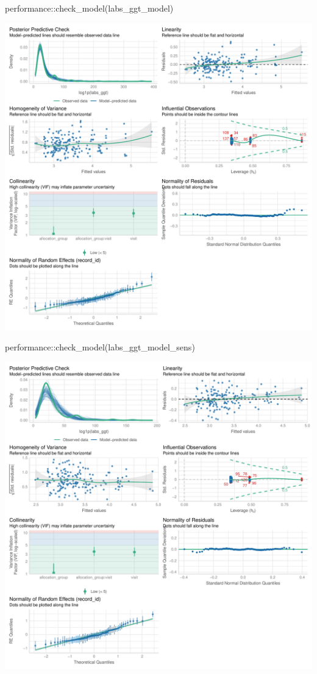 \documentclass[
  letterpaper,
  DIV=11,
  numbers=noendperiod]{scrartcl}
\newenvironment{Shaded}{\begin{snugshade}}{\end{snugshade}}
\newcommand{\FunctionTok}[1]{\textcolor[rgb]{0.28,0.35,0.67}{#1}}
\newcommand{\NormalTok}[1]{\textcolor[rgb]{0.00,0.23,0.31}{#1}}
\newcommand{\SpecialCharTok}[1]{\textcolor[rgb]{0.37,0.37,0.37}{#1}}
\begin{document}
\begin{Shaded}
\begin{Highlighting}[]
\NormalTok{performance}\SpecialCharTok{::}\FunctionTok{check\_model}\NormalTok{(labs\_ggt\_model)}
\end{Highlighting}
\end{Shaded}

\includegraphics{Outcomes_V1V2V3_files/figure-pdf/labs_ggt_4-1.pdf}

\begin{Shaded}
\begin{Highlighting}[]
\NormalTok{performance}\SpecialCharTok{::}\FunctionTok{check\_model}\NormalTok{(labs\_ggt\_model\_sens)}
\end{Highlighting}
\end{Shaded}

\includegraphics{Outcomes_V1V2V3_files/figure-pdf/labs_ggt_4-2.pdf}
\end{document}
